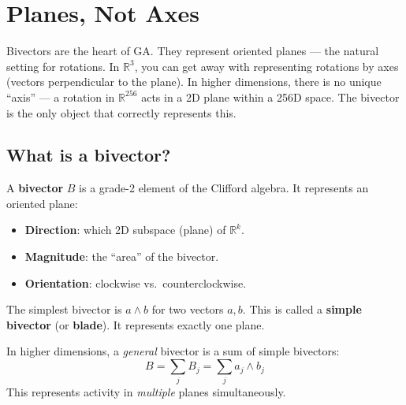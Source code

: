 \documentclass[11pt, twoside, openright]{memoir}
\newcommand{\op}{\wedge}          %
\numberwithin{equation}{chapter}
\begin{document}
\chapter{Planes, Not Axes}
\label{chap:bivectors}

\begin{whycare}
Bivectors are the heart of GA.  They represent oriented planes --- the
natural setting for rotations.  In $\mathbb{R}^3$, you can get away with
representing rotations by axes (vectors perpendicular to the plane).  In
higher dimensions, there is no unique ``axis'' --- a rotation in
$\mathbb{R}^{256}$ acts in a 2D plane within a 256D space.  The bivector
is the only object that correctly represents this.
\end{whycare}

\section{What is a bivector?}

A \textbf{bivector} $B$ is a grade-2 element of the Clifford algebra.
It represents an oriented plane:

\begin{itemize}[nosep]
\item \textbf{Direction}: which 2D subspace (plane) of $\mathbb{R}^k$.
\item \textbf{Magnitude}: the ``area'' of the bivector.
\item \textbf{Orientation}: clockwise vs.\ counterclockwise.
\end{itemize}

The simplest bivector is $a \op b$ for two vectors $a, b$.  This is
called a \textbf{simple bivector} (or \textbf{blade}).  It represents
exactly one plane.

In higher dimensions, a \emph{general} bivector is a sum of simple
bivectors:
\begin{equation}
  B = \sum_{j} B_j = \sum_{j} a_j \op b_j
\end{equation}
This represents activity in \emph{multiple} planes simultaneously.
\end{document}
